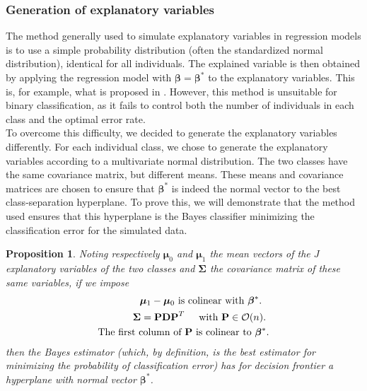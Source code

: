 \documentclass[preprint,12pt]{elsarticle}
\newtheorem{theorem}{Proposition}
\begin{document}
\subsubsection{Generation of explanatory variables}
The method generally used to simulate explanatory variables in regression models is to use a simple probability distribution (often the standardized normal distribution), identical for all individuals. The explained variable is then obtained by applying the regression model with $\bm{\beta} = \bm{\beta}^*$ to the explanatory variables. This is, for example, what is proposed in \cite{picto}. However, this method is unsuitable for binary classification, as it fails to control both the number of individuals in each class and the optimal error rate.\\
\indent To overcome this difficulty, we decided to generate the explanatory variables differently. For each individual class, we chose to generate the explanatory variables according to a multivariate normal distribution. The two classes have the same covariance matrix, but different means. These means and covariance matrices are chosen to ensure that $\bm{\beta}^*$ is indeed the normal vector to the best class-separation hyperplane. To prove this, we will demonstrate that the method used ensures that this hyperplane is the Bayes classifier minimizing the classification error for the simulated data.\\
\begin{theorem}
Noting respectively $\bm{\mu}_0$ and $\bm{\mu}_1$ the mean vectors of the $J$ explanatory variables of the two classes and $\bm{\Sigma}$ the covariance matrix of these same variables, if we impose
\begin{align}
    \bm{\mu}_1 - \bm{\mu}_0 \textnormal{ is} & \textnormal{ colinear with }  \bm{\beta}^*.\\
    \bm{\Sigma} = \mathbf{P D P}^T &\hspace{0.5 cm} \textnormal{with } \mathbf{P} \in \mathcal{O}(n).\\
  \textnormal{The first column of }&  \mathbf{P} \textnormal{ is colinear to } \bm{\beta}^*.
\end{align}
\noindent then the Bayes estimator (which, by definition, is the best estimator for minimizing the probability of classification error) has for decision frontier a hyperplane with normal vector $\bm{\beta}^*$.
\end{theorem}
\end{document}
